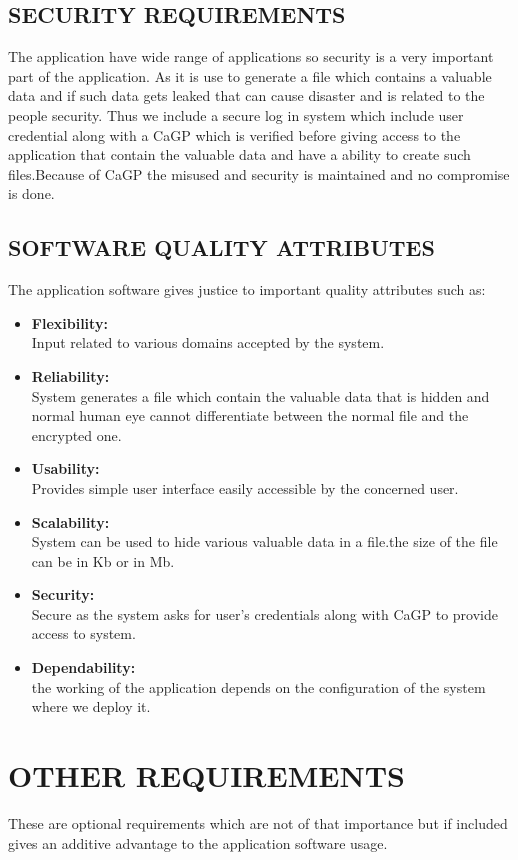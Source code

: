 \documentclass[12pt]{extreport}
\begin{document}
     \subsection{SECURITY REQUIREMENTS}
\hspace*{5em}The application have wide range of applications so security is a very important part of the application. As it is use to generate a file which contains a valuable data and if such data gets leaked that can cause disaster and is related to the people security. Thus we include a secure log in system which include user credential along with a CaGP which is verified before giving access to the application that contain the valuable data and have a ability to create such files.Because of CaGP the misused and security is maintained and no compromise is done.
     \subsection{SOFTWARE QUALITY ATTRIBUTES}
The application software gives justice to important quality attributes such as:
\begin{itemize}
\item \textbf{Flexibility:}\\ Input related to various domains accepted by the system.
\item \textbf{Reliability:}\\ System generates a file which contain the valuable data that is hidden and normal human eye cannot differentiate
between the normal file and the encrypted one.
\item \textbf{Usability:}\\Provides simple user interface easily accessible by the concerned user.
\item \textbf{Scalability:}\\System can be used to hide various valuable data in a file.the size of the file can be in Kb or in Mb.
\item \textbf{Security:}\\Secure as the system asks for user's credentials along with CaGP to provide access to system.
\item \textbf{Dependability:}\\the working of the application depends on the configuration of the system where we deploy it.
\end{itemize}     
    
\noindent
\section{OTHER REQUIREMENTS}
\hspace*{5em}These are optional requirements which are not of that importance but if included gives an additive advantage to the application software usage.
\end{document}
